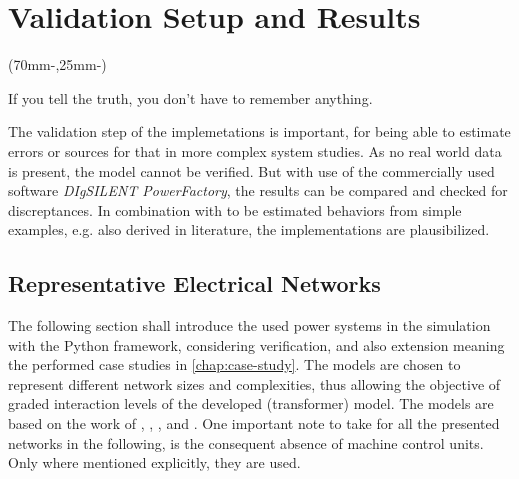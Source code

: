 

\chapter{Validation Setup and Results}
\label{chap:verification}

\begin{textblock*}{.7\textwidth}(70mm-\offset,25mm-\offset)
    \begin{fquote}
        If you tell the truth, you don't have to remember anything.
    \end{fquote}
\end{textblock*}

The validation step of the implemetations is important, for being able to estimate errors or sources for that in more complex system studies.
As no real world data is present, the model cannot be verified.
But with use of the commercially used software \textit{DIgSILENT PowerFactory}, the results can be compared and checked for discreptances.
In combination with to be estimated behaviors from simple examples, e.g. also derived in literature, the implementations are plausibilized.

\section{Representative Electrical Networks}
\label{sec:networks}

The following section shall introduce the used power systems in the simulation with the Python framework, considering verification, and also extension meaning the performed case studies in \autoref{chap:case-study}. 
The models are chosen to represent different network sizes and complexities, thus allowing the objective of graded interaction levels of the developed (transformer) model. 
The models are based on the work of \textcite{machowski_2020}, \textcite{kundur_2022}, \textcite{IEEELoadModeling_2022}, and \textcite{vancutsem_2020}.
One important note to take for all the presented networks in the following, is the consequent absence of machine control units. 
Only where mentioned explicitly, they are used.


